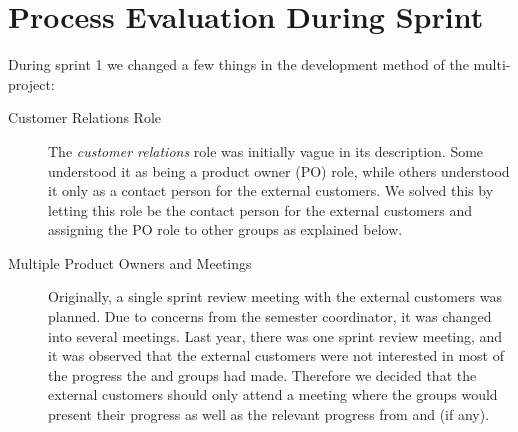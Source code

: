 \section{Process Evaluation During Sprint}\label{sec:s1_processeval}
During sprint 1 we changed a few things in the development method of the multi-project:

\begin{description}
  \item[Customer Relations Role] The \emph{customer relations} role was initially vague in its description. Some understood it as being a product owner (PO) role, while others understood it only as a contact person for the external customers. We solved this by letting this role be the contact person for the external customers and assigning the PO role to other groups as explained below.
  \item[Multiple Product Owners and Meetings] Originally, a single sprint review meeting with the external customers was planned. Due to concerns from the semester coordinator, it was changed into several meetings. Last year, there was one sprint review meeting, and it was observed that the external customers were not interested in most of the progress the \db and \bd groups had made. Therefore we decided that the external customers should only attend a meeting where the \gui groups would present their progress as well as the relevant progress from \db and \bd (if any).


\end{description}
